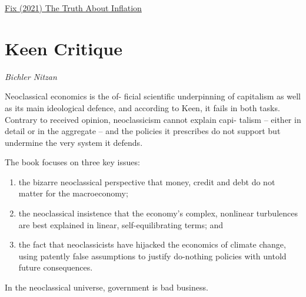 \documentclass[
]{book}
\begin{document}
\href{https://economicsfromthetopdown.com/2021/11/24/the-truth-about-inflation/}{Fix (2021) The Truth About Inflation}

\hypertarget{keen-critique}{%
\section{Keen Critique}\label{keen-critique}}

\emph{Bichler Nitzan}

Neoclassical economics is the of-
ficial scientific underpinning of capitalism as well as its main ideological defence, and according
to Keen, it fails in both tasks. Contrary to received opinion, neoclassicism cannot explain capi-
talism -- either in detail or in the aggregate -- and the policies it prescribes do not support but
undermine the very system it defends.

The book focuses on three key issues:

\begin{enumerate}
\def\labelenumi{(\arabic{enumi})}
\item
  the bizarre neoclassical perspective that money,
  credit and debt do not matter for the macroeconomy;
\item
  the neoclassical insistence that the
  economy's complex, nonlinear turbulences are best explained in linear, self-equilibrating terms;
  and
\item
  the fact that neoclassicists have hijacked the economics of climate change, using patently
  false assumptions to justify do-nothing policies with untold future consequences.
\end{enumerate}

In the neoclassical universe,
government is bad business.
\end{document}
